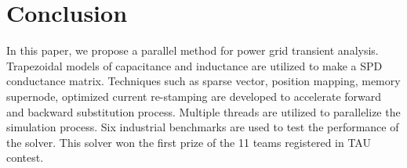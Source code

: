 \section{Conclusion}
In this paper, we propose a parallel method for power grid transient analysis. Trapezoidal models of capacitance and inductance are 
utilized to make a SPD conductance matrix. Techniques such as sparse vector, position mapping, memory supernode, optimized current 
re-stamping are developed to accelerate forward and backward substitution process. Multiple threads are utilized to parallelize the
simulation process. Six industrial benchmarks are used to test the performance of the solver. This solver won the first prize of the
11 teams registered in TAU contest.